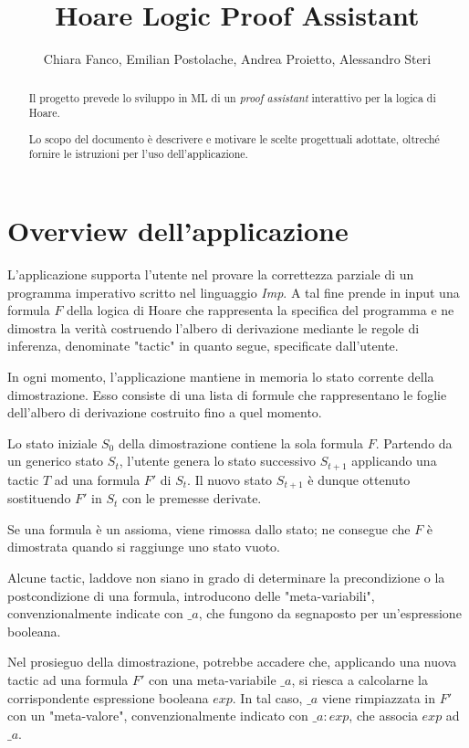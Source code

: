 \documentclass[]{article}
\title{Hoare Logic Proof Assistant}
\author{Chiara Fanco, Emilian Postolache, Andrea Proietto, Alessandro Steri}
\begin{document}
\maketitle

\begin{abstract}
Il progetto prevede lo sviluppo in ML di un \emph{proof assistant} interattivo per la logica di Hoare.
\par
Lo scopo del documento \`e descrivere e motivare le scelte progettuali adottate, oltrech\'e fornire le istruzioni per l'uso dell'applicazione.
\end{abstract}

\section{Overview dell'applicazione}
L'applicazione supporta l'utente nel provare la correttezza parziale di un programma imperativo scritto nel linguaggio \emph{Imp}. A tal fine prende in input una formula $F$ della logica di Hoare che rappresenta la specifica del programma e ne dimostra la verit\`a costruendo l'albero di derivazione mediante le regole di inferenza, denominate "tactic" in quanto segue, specificate dall'utente.
\par
In ogni momento, l'applicazione mantiene in memoria lo stato corrente della dimostrazione. Esso consiste di una lista di formule che rappresentano le foglie dell'albero di derivazione costruito fino a quel momento.
\par
Lo stato iniziale $S_0$ della dimostrazione contiene la sola formula $F$. Partendo da un generico stato $S_t$, l'utente genera lo stato successivo $S_{t+1}$ applicando una tactic $T$ ad una formula $F'$ di $S_t$. Il nuovo stato $S_{t+1}$ \`e dunque ottenuto sostituendo $F'$ in $S_t$ con le premesse derivate.
\par
Se una formula \`e un assioma, viene rimossa dallo stato; ne consegue che $F$ \`e dimostrata quando si raggiunge uno stato vuoto.
\par
Alcune tactic, laddove non siano in grado di determinare la precondizione o la postcondizione di una formula, introducono delle "meta-variabili", convenzionalmente indicate con $\_a$, che fungono da segnaposto per un'espressione booleana.
\par
Nel prosieguo della dimostrazione, potrebbe accadere che, applicando una nuova tactic ad una formula $F'$ con una meta-variabile $\_a$, si riesca a calcolarne la corrispondente espressione booleana $exp$. In tal caso, $\_a$ viene rimpiazzata in $F'$ con un "meta-valore", convenzionalmente indicato con $\_a : exp$, che associa $exp$ ad $\_a$.
\end{document}
